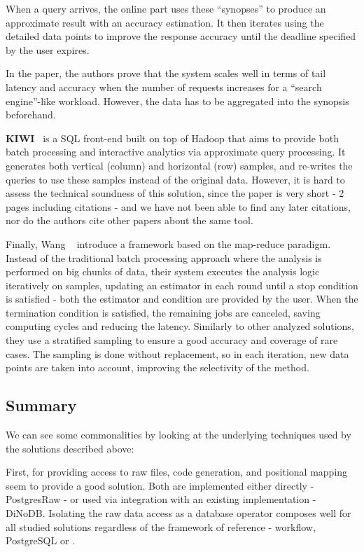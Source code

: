When a query arrives, the online part uses these ``synopses'' to produce 
an approximate result with an accuracy estimation. It then iterates 
using the detailed data points to improve the response accuracy until the
deadline specified by the user expires.

In the paper, the authors prove that the system scales well in terms 
of tail latency and accuracy when the number of requests increases for a 
``search engine''-like workload. However, the data has to be aggregated into 
the synopsis beforehand.

\medskip

\textbf{KIWI}~\cite{Kim2015} is a SQL front-end built on top of Hadoop that aims 
to provide both batch processing and interactive analytics via approximate
query processing. It generates both vertical (column) and horizontal (row) 
samples, and re-writes the queries to use these samples instead of the original 
data. However, it is hard to assess the technical soundness of this 
solution, since the paper is very short - 2 pages including citations -
and we have not been able to find any later citations, nor do the authors cite 
other papers about the same tool.

\medskip

Finally, Wang \etal~\cite{WangYi2015} introduce a framework based on the 
map-reduce paradigm. Instead of the traditional batch processing approach 
where the analysis is performed on big chunks of data, their system executes the 
analysis logic iteratively on samples, updating an estimator in each round 
until a stop condition is satisfied - both the estimator and condition are provided by 
the user. When the termination condition is satisfied, the remaining jobs are 
canceled, saving computing cycles and reducing the latency. Similarly to other 
analyzed solutions, they use a stratified sampling to ensure a good accuracy and 
coverage of rare cases. 
The sampling is done without replacement, so in each iteration, new data points 
are taken into account, improving the selectivity of the method.

\subsection{Summary}
We can see some commonalities by looking at the underlying techniques used by the 
solutions described above:

First, for providing access to raw files, code generation, and positional 
mapping seem to provide a good solution. Both are implemented either directly - 
PostgresRaw - or used via integration with an existing implementation - DiNoDB. 
Isolating the raw data access as a database operator composes well for all 
studied solutions regardless of the framework of reference - workflow, 
PostgreSQL or \scidb.

